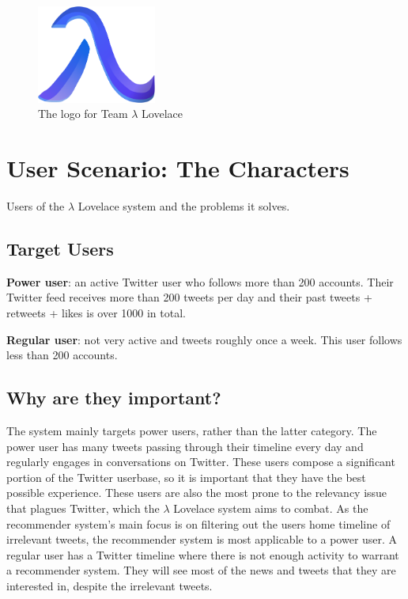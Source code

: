 \documentclass{article}
\begin{document}
\begin{figure}[H]
    \includegraphics[width=0.35\textwidth, center]{ll-logo}
    \caption{The logo for Team $\lambda$ Lovelace}
\end{figure}


\newpage


\section{User Scenario: The Characters} %

Users of the $\lambda$ Lovelace system and the problems it solves.

\subsection{Target Users}
\begin{itemize*}
    \item \textbf{Power user}: an active Twitter user who follows more than 200 accounts. Their Twitter feed receives more than 200 tweets per day and their past tweets + retweets + likes is over 1000 in total.
    \item \textbf{Regular user}: not very active and tweets roughly once a week. This user follows less than 200 accounts.
\end{itemize*} 

\subsection{Why are they important?}
The system mainly targets power users, rather than the latter category. The power user has many tweets passing through their timeline every day and regularly engages in conversations on Twitter. These users compose a significant portion of the Twitter userbase, so it is important that they have the best possible experience. These users are also the most prone to the relevancy issue that plagues Twitter, which the $\lambda$ Lovelace system aims to combat.
As the recommender system's main focus is on filtering out the users home timeline of irrelevant tweets, the recommender system is most applicable to a power user. A regular user has a Twitter timeline where there is not enough activity to warrant a recommender system. They will see most of the news and tweets that they are interested in, despite the irrelevant tweets. 
\end{document}
